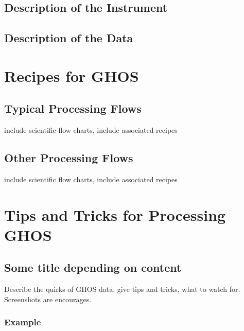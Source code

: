 \documentclass[letterpaper,10pt,english]{sphinxmanual}
\begin{document}
\subsection{Description of the Instrument}
\label{GHOS/instrument:description-of-the-instrument}

\subsection{Description of the Data}
\label{GHOS/instrument:description-of-the-data}

\section{Recipes for GHOS}
\label{GHOS/recipes:recipes-for-ghos}\label{GHOS/recipes:ghos-recipes-and-flows}\label{GHOS/recipes::doc}

\subsection{Typical Processing Flows}
\label{GHOS/recipes:typical-processing-flows}
include scientific flow charts, include associated recipes


\subsection{Other Processing Flows}
\label{GHOS/recipes:other-processing-flows}
include scientific flow charts, include associated recipes


\section{Tips and Tricks for Processing GHOS}
\label{GHOS/tipstricks:tips-and-tricks-for-processing-ghos}\label{GHOS/tipstricks:ghos-tips-tricks}\label{GHOS/tipstricks::doc}

\subsection{Some title depending on content}
\label{GHOS/tipstricks:some-title-depending-on-content}
Describe the quirks of GHOS data, give tips
and tricks, what to watch for.  Screenshots are encourages.


\subsubsection{Example}
\label{GHOS/tipstricks:example}
\end{document}
